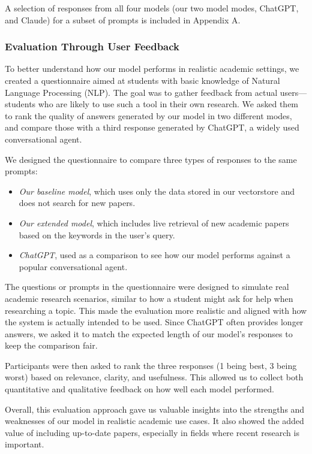 \documentclass[fleqn,moreauthors,10pt]{ds_report}
\begin{document}
A selection of responses from all four models (our two model modes, ChatGPT, and Claude) for a subset of prompts is included in Appendix A.

\subsubsection*{Evaluation Through User Feedback}

To better understand how our model performs in realistic academic settings, we created a questionnaire aimed at students with basic knowledge of Natural Language Processing (NLP). The goal was to gather feedback from actual users—students who are likely to use such a tool in their own research. We asked them to rank the quality of answers generated by our model in two different modes, and compare those with a third response generated by ChatGPT, a widely used conversational agent.

We designed the questionnaire to compare three types of responses to the same prompts:

\begin{itemize}
  \item \textit{Our baseline model}, which uses only the data stored in our vectorstore and does not search for new papers.
  \item \textit{Our extended model}, which includes live retrieval of new academic papers based on the keywords in the user's query.
  \item \textit{ChatGPT}, used as a comparison to see how our model performs against a popular conversational agent.
\end{itemize}

The questions or prompts in the questionnaire were designed to simulate real academic research scenarios, similar to how a student might ask for help when researching a topic. This made the evaluation more realistic and aligned with how the system is actually intended to be used. Since ChatGPT often provides longer answers, we asked it to match the expected length of our model’s responses to keep the comparison fair.

Participants were then asked to rank the three responses (1 being best, 3 being worst) based on relevance, clarity, and usefulness. This allowed us to collect both quantitative and qualitative feedback on how well each model performed.

Overall, this evaluation approach gave us valuable insights into the strengths and weaknesses of our model in realistic academic use cases. It also showed the added value of including up-to-date papers, especially in fields where recent research is important.
\end{document}
